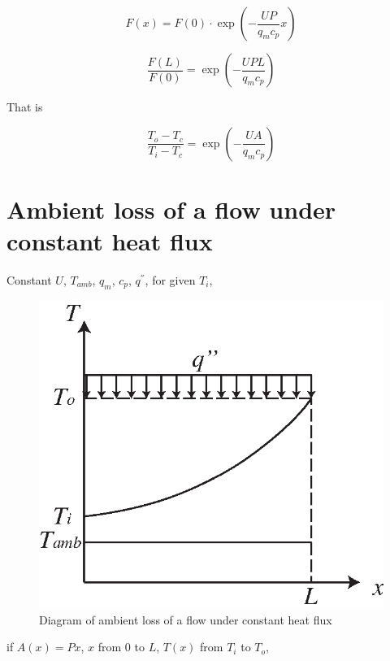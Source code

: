 \documentclass{article}
\begin{document}
\begin{equation*}
	F(x)=F(0)\cdot\exp(-\dfrac{UP}{q_{m}c_{p}}x)
\end{equation*}


\begin{equation*}
	\dfrac{F(L)}{F(0)}=\exp(-\dfrac{UPL}{q_{m}c_{p}})
\end{equation*}


That is

\begin{equation*}
	\frac{T_{o}-T_{c}}{T_{i}-T_{c}}=\exp(-\frac{UA}{q_{m}c_{p}})
\end{equation*}
\clearpage{}

\section{\noindent \label{sec:CTCHTHT}Ambient loss of a flow under constant
heat flux}

Constant $U$, $T_{amb}$, $q_{m}$, $c_{p}$, $q^{''}$, for given
$T_{i}$,

\noindent \begin{center}
\begin{figure}[h]
	\noindent \centering{}\includegraphics[width=0.8\columnwidth]{graphics/CTCHFHX}
	\protect\caption{\label{fig:CTCHFHX}Diagram of ambient loss of a flow under constant
heat flux}
\end{figure}

\par\end{center}

if $A(x)=Px$, $x$ from $0$ to $L$, $T(x)$ from $T_{i}$ to $T_{o}$,
\end{document}

